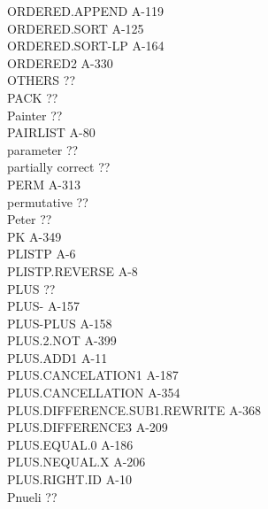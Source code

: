 \documentclass[10pt]{book}
\newenvironment{pubasis}{\begin{flushleft}}{\end{flushleft}}
\begin{document}
\begin{pubasis}
ORDERED.APPEND                               A-119\\
ORDERED.SORT                                 A-125\\
ORDERED.SORT-LP                              A-164\\
ORDERED2                                     A-330\\
OTHERS                                       ??\\
PACK                                         ??\\
Painter                                      ??\\
PAIRLIST                                     A-80\\
parameter                                    ??\\
partially correct                            ??\\
PERM                                         A-313\\
permutative                                  ??\\
Peter                                        ??\\
PK                                           A-349\\
PLISTP                                       A-6\\
PLISTP.REVERSE                               A-8\\
PLUS                                         ??\\
PLUS-                                        A-157\\
PLUS-PLUS                                    A-158\\
PLUS.2.NOT                                   A-399\\
PLUS.ADD1                                    A-11\\
PLUS.CANCELATION1                            A-187\\
PLUS.CANCELLATION                            A-354\\
PLUS.DIFFERENCE.SUB1.REWRITE                 A-368\\
PLUS.DIFFERENCE3                             A-209\\
PLUS.EQUAL.0                                 A-186\\
PLUS.NEQUAL.X                                A-206\\
PLUS.RIGHT.ID                                A-10\\
Pnueli                                       ??\\

\end{pubasis}
\end{document}
